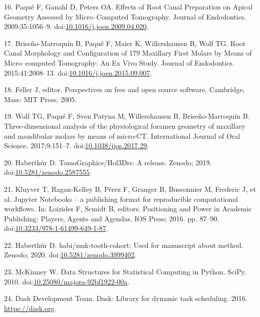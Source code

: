 \documentclass[
  american,
]{article}
\newenvironment{cslreferences}%
  {}%
  {\par}
\begin{document}
\begin{cslreferences}
\leavevmode\hypertarget{ref-DLVCfdzK}{}%
16. Paqué F, Ganahl D, Peters OA. Effects of Root Canal Preparation on Apical Geometry Assessed by Micro--Computed Tomography. Journal of Endodontics. 2009;35:1056--9. doi:\href{https://doi.org/10.1016/j.joen.2009.04.020}{10.1016/j.joen.2009.04.020}.

\leavevmode\hypertarget{ref-ZTgDEakx}{}%
17. Briseño-Marroquín B, Paqué F, Maier K, Willershausen B, Wolf TG. Root Canal Morphology and Configuration of 179 Maxillary First Molars by Means of Micro--computed Tomography: An Ex Vivo Study. Journal of Endodontics. 2015;41:2008--13. doi:\href{https://doi.org/10.1016/j.joen.2015.09.007}{10.1016/j.joen.2015.09.007}.

\leavevmode\hypertarget{ref-11csWtgxP}{}%
18. Feller J, editor. Perspectives on free and open source software. Cambridge, Mass: MIT Press; 2005.

\leavevmode\hypertarget{ref-1Gn1pVZXt}{}%
19. Wolf TG, Paqué F, Sven Patyna M, Willershausen B, Briseño-Marroquín B. Three-dimensional analysis of the physiological foramen geometry of maxillary and mandibular molars by means of micro-CT. International Journal of Oral Science. 2017;9:151--7. doi:\href{https://doi.org/10.1038/ijos.2017.29}{10.1038/ijos.2017.29}.

\leavevmode\hypertarget{ref-115PPSuQp}{}%
20. Haberthür D. TomoGraphics/Hol3Drs: A release. Zenodo; 2019. doi:\href{https://doi.org/10.5281/zenodo.2587555}{10.5281/zenodo.2587555}.

\leavevmode\hypertarget{ref-pQ6Wbz73}{}%
21. Kluyver T, Ragan-Kelley B, Pérez F, Granger B, Bussonnier M, Frederic J, et al. Jupyter Notebooks -- a publishing format for reproducible computational workflows. In: Loizides F, Scmidt B, editors. Positioning and Power in Academic Publishing: Players, Agents and Agendas. IOS Press; 2016. pp. 87--90. doi:\href{https://doi.org/10.3233/978-1-61499-649-1-87}{10.3233/978-1-61499-649-1-87}.

\leavevmode\hypertarget{ref-tZRGGuMm}{}%
22. Haberthür D. habi/zmk-tooth-cohort: Used for manuscript about method. Zenodo; 2020. doi:\href{https://doi.org/10.5281/zenodo.3999402}{10.5281/zenodo.3999402}.

\leavevmode\hypertarget{ref-U5AcoDOX}{}%
23. McKinney W. Data Structures for Statistical Computing in Python. SciPy. 2010. doi:\href{https://doi.org/10.25080/majora-92bf1922-00a}{10.25080/majora-92bf1922-00a}.

\leavevmode\hypertarget{ref-hj1CnyWB}{}%
24. Dask Development Team. Dask: Library for dynamic task scheduling. 2016. \url{https://dask.org}.


\end{cslreferences}
\end{document}
